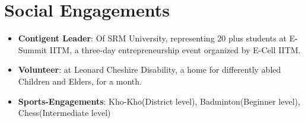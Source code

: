 \section{Social Engagements}
    \begin{itemize}
		\item \textbf{Contigent Leader}{: Of SRM University, representing 20 plus students at E-Summit IITM, a three-day entrepreneurship event organized by E-Cell IITM}. \\
		\item \textbf{Volunteer}{: at Leonard Cheshire Disability, a home for differently abled Children and Elders, for a month.} \\
        \item \textbf{Sports-Engagements}{: Kho-Kho(District level), Badminton(Beginner level), Chess(Intermediate level) }
    \end{itemize}
